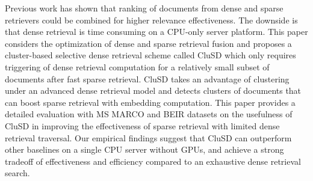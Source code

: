 Previous work has shown that  ranking of documents from dense and sparse retrievers could be combined for higher relevance effectiveness. 
The downside is that dense retrieval is time consuming on a CPU-only server platform.
This paper considers the optimization of dense and sparse retrieval fusion and 
 proposes a cluster-based selective dense retrieval scheme called CluSD which only requires triggering of dense retrieval 
computation for a relatively small subset of documents after  fast sparse retrieval. 
CluSD takes an advantage of clustering under an advanced  dense retrieval model and
detects clusters of documents that can boost sparse retrieval with  embedding  computation.
This paper provides a detailed evaluation with MS MARCO and BEIR  datasets  
on the usefulness of CluSD in improving the effectiveness of sparse retrieval with limited dense  retrieval
traversal.  Our empirical findings suggest that CluSD can outperform other baselines on a single CPU server 
without GPUs, and achieve a strong tradeoff of effectiveness and efficiency compared to an exhaustive dense retrieval search.

